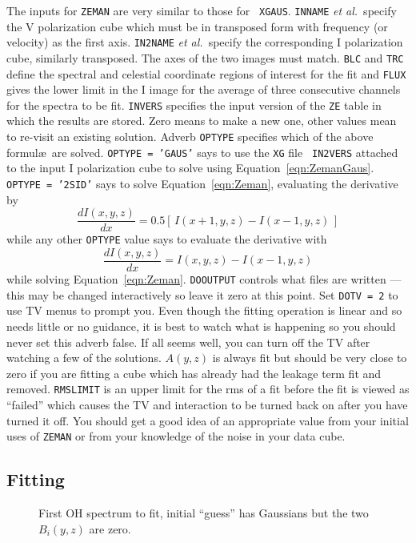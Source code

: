 \documentclass[twoside]{article}
\newcommand{\Me}[1]{\textcolor{mecol}{#1}}
\newcommand{\putfig}[1]{\texttt{[image: \#1.eps]}}
\begin{document}
The inputs for {\tt ZEMAN} are very similar to those for {\tt
  XGAUS}\@.  {\tt INNAME} {\it et al.}~specify the V polarization
cube which must be in transposed form with frequency (or velocity) as
the first axis.  {\tt IN2NAME} {\it et al.}~specify the corresponding
I polarization cube, similarly transposed.  The axes of the two images
must match.  {\tt BLC} and {\tt TRC} define the spectral and celestial
coordinate regions \Me{of interest} for the fit and {\tt FLUX} gives
the lower limit in the I image for the average of three consecutive
channels for the spectra to be fit.  {\tt INVERS} specifies the input
version of the {\tt ZE} table in which the results are stored.  Zero
means to make a new one, other values mean to re-visit an existing
solution.  Adverb {\tt OPTYPE} specifies which of the above formul\ae\
are solved.  {\tt OPTYPE = 'GAUS'} says to use the {\tt XG} file {\tt
  IN2VERS} attached to the input I polarization cube to solve using
Equation~\ref{eqn:ZemanGaus}.  {\tt OPTYPE = '2SID'} says to solve
Equation~\ref{eqn:Zeman}, evaluating the derivative by
$$
\frac{dI(x,y,z)}{dx} = 0.5 \left[\, I(x+1,y,z) - I(x-1,y,z) \,\right]
$$
while any other {\tt OPTYPE} value says to evaluate the derivative
with
$$
\frac{dI(x,y,z)}{dx} = I(x,y,z) - I(x-1,y,z)
$$
while solving Equation~\ref{eqn:Zeman}.  {\tt DOOUTPUT} controls what
files are written --- this may be changed interactively so leave it
zero at this point.  Set {\tt DOTV = 2} to use TV menus to prompt you.
Even though the fitting operation is linear and so needs little or no
guidance, it is best to watch what is happening so you should never
set this adverb false.  If all seems well, you can turn off the TV
after watching a few of the solutions.  $A(y,z)$ is always fit but
should be very close to zero if you are fitting a cube which has
already had the leakage term fit and removed.  {\tt RMSLIMIT} is an
upper limit for the rms of a fit before the fit is viewed as
``failed'' which causes the TV and interaction to be turned back on
after you have turned it off.  You should get a good idea of an
appropriate value from your initial uses of {\tt ZEMAN} or from your
knowledge of the noise in your data cube.

\subsection{Fitting}

\begin{figure}
\begin{center}
\resizebox{6.0in}{!}{\putfig{ZEMAN.init}}
\caption{First OH spectrum to fit, initial ``guess'' has Gaussians but
   the two $B_i(y,z)$ are zero.}
\label{fig:ZEMAN.init}
\end{center}
\end{figure}
\end{document}
